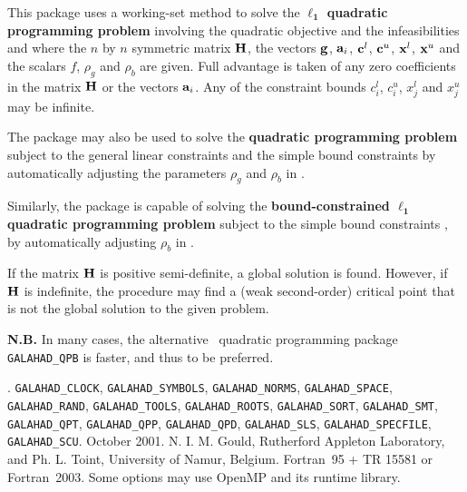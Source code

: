 \documentclass{galahad}
\newcommand{\packagename}{QPA}
\newcommand{\fullpackagename}{\libraryname\_\packagename}
\begin{document}
\galheader


\galsummary
This package uses a working-set method
to solve the {\bf $\mathbf{\ell_1}$ quadratic programming problem}
involving the quadratic objective
and the infeasibilities
and
where the $n$ by $n$ symmetric matrix ${\mathbf{H}}$, the 
vectors ${\mathbf{g}}$, ${\mathbf{a}}_{i}$, ${\mathbf{c}}^{l}$, ${\mathbf{c}}^{u}$, ${\mathbf{x}}^{l}$, ${\mathbf{x}}^{u}$ 
and the scalars $f$, $\rho_g$ and $\rho_b$ are given.
Full advantage is taken of any zero coefficients in the matrix ${\mathbf{H}}$ or the
vectors ${\mathbf{a}}_{i}$. 
Any of the constraint bounds $c_{i}^{l}$, $c_{i}^{u}$, 
$x_{j}^{l}$ and $x_{j}^{u}$ may be infinite.

The package may also be used to solve the {\bf quadratic programming problem}
subject to the general linear constraints
and the simple bound constraints
by automatically adjusting the parameters $\rho_g$ and $\rho_b$ in .

Similarly, the package is capable of solving the 
{\bf bound-constrained $\mathbf{\ell_1}$ quadratic programming problem}
subject to the simple bound constraints ,
by automatically adjusting $\rho_b$ in .

If the matrix ${\mathbf{H}}$ is positive semi-definite, a global
solution is found. However, if ${\mathbf{H}}$ is indefinite,
the procedure may find  a (weak second-order) critical point 
that is not the global solution to the given problem.

{\bf N.B.} In many cases, the alternative \galahad\ quadratic 
programming package {\tt GALAHAD\_QPB} is faster, and thus 
to be preferred.


\galattributes
\galversions{\tt  \fullpackagename\_single, \fullpackagename\_double}.
\galuses 
{\tt GALAHAD\_\-CLOCK},
{\tt GALAHAD\_SY\-M\-BOLS}, 
{\tt GALAHAD\-\_NORMS}, 
{\tt GALAHAD\-\_SPACE}, 
{\tt GALAHAD\_RA\-ND}, 
{\tt GALAHAD\_TOOLS}, 
{\tt GALAHAD\_ROOTS}, 
{\tt GALAHAD\_SORT},
{\tt GALAHAD\_\-SMT}, 
{\tt GALAHAD\-\_QPT},
{\tt GALAHAD\_QPP},
{\tt GALAHAD\_QPD},
{\tt GALAHAD\_SLS}, 
{\tt GALAHAD\_SPECFILE}, 
{\tt GALAHAD\_SCU}.
\galdate October 2001.
\galorigin N. I. M. Gould, Rutherford Appleton Laboratory, and
Ph. L. Toint, University of Namur, Belgium.
\gallanguage Fortran~95 + TR 15581 or Fortran~2003. 
\galparallelism Some options may use OpenMP and its runtime library.
\end{document}

